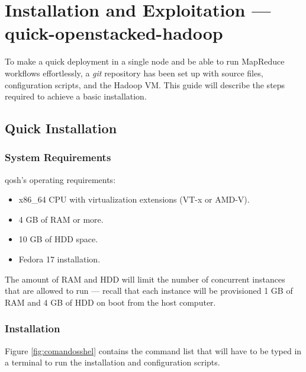\chapter{Installation and Exploitation --- quick-openstacked-hadoop}\label{cap:guiainstalacion}
\noindent To make a quick deployment in a single node and be able to run MapReduce workflows effortlessly, a \emph{git} repository has been set up with source files, configuration scripts, and the Hadoop VM. This guide will describe the steps required to achieve a basic installation.

\section{Quick Installation}\label{sec:instalacionqosh}

\subsection{System Requirements}\label{subsec:reqsis}
\noindent qosh's operating requirements:

\begin{itemize}
    \item x86\_64 CPU with virtualization extensions (VT-x or AMD-V).
    \item 4 GB of RAM or more.
    \item 10 GB of HDD space.
    \item Fedora 17 installation.
\end{itemize}

The amount of RAM and HDD will limit the number of concurrent instances that are allowed to run --- recall that each instance will be provisioned 1 GB of RAM and 4 GB of HDD on boot from the host computer.

\subsection{Installation}\label{subsec:instalacion}
\noindent Figure \ref{fig:comandosshel} contains the command list that will have to be typed in a terminal to run the installation and configuration scripts.

